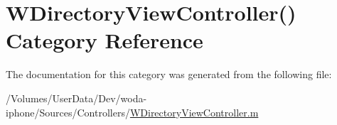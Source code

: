 \hypertarget{category_w_directory_view_controller_07_08}{\section{W\-Directory\-View\-Controller() Category Reference}
\label{category_w_directory_view_controller_07_08}
}


The documentation for this category was generated from the following file\-:\begin{DoxyCompactItemize}
\item 
/\-Volumes/\-User\-Data/\-Dev/woda-\/iphone/\-Sources/\-Controllers/\hyperlink{_w_directory_view_controller_8m}{W\-Directory\-View\-Controller.\-m}\end{DoxyCompactItemize}
